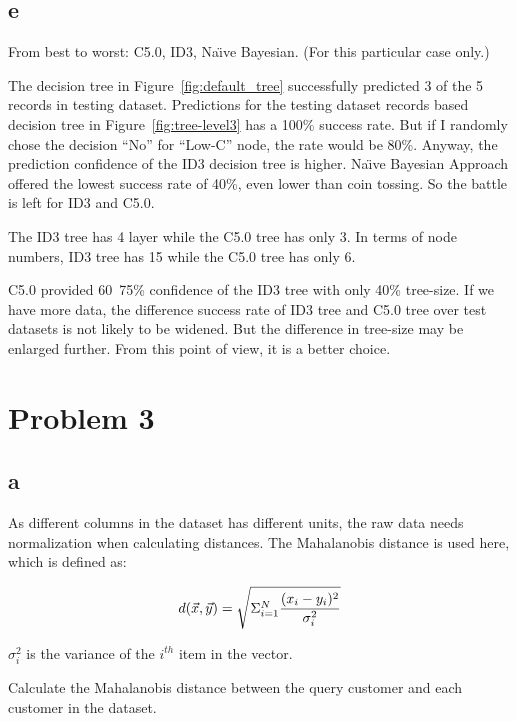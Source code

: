 \documentclass[12pt]{article}
\begin{document}
\subsection{e}
From best to worst: C5.0, ID3, Na{\"\i}ve Bayesian. (For this particular case only.)

The decision tree in Figure~\ref{fig:default_tree} successfully predicted 3 of the 5 records in testing dataset. Predictions for the testing dataset records based decision tree in Figure~\ref{fig:tree-level3} has a 100\% success rate. But if I randomly chose the decision ``No'' for ``Low-C'' node, the rate would be 80\%. Anyway, the prediction confidence of the ID3 decision tree is higher. Na{\"\i}ve Bayesian Approach offered the lowest success rate of 40\%, even lower than coin tossing. So the battle is left for ID3 and C5.0.

The ID3 tree has 4 layer while the C5.0 tree has only 3. In terms of node numbers, ID3 tree has 15 while the C5.0 tree has only 6.

C5.0 provided 60~75\% confidence of the ID3 tree with only 40\% tree-size. If we have more data, the difference success rate of ID3 tree and C5.0 tree over test datasets is not likely to be widened. But the difference in tree-size may be enlarged further. From this point of view, it is a better choice.

\section{Problem 3}
\subsection{a}
As different columns in the dataset has different units, the raw data needs normalization when calculating distances. The Mahalanobis distance is used here, which is defined as:

\begin{equation}
d(\vec{x},\vec{y})=\sqrt{\Sigma_{i=1}^{N}{(x_{i}-y_{i})^{2}\over \sigma_{i}^{2}}}
\end{equation}

$\sigma_{i}^{2}$ is the variance of the $i^{th}$ item in the vector.

Calculate the Mahalanobis distance between the query customer and each customer in the dataset.
\end{document}
